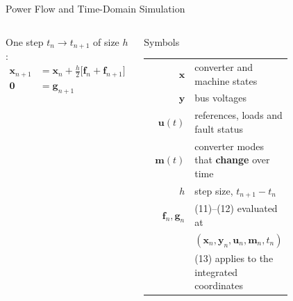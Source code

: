 \documentclass{beamer}
\begin{document}
\begin{frame}{Power Flow and Time-Domain Simulation}
\begin{columns}[t,onlytextwidth]
\begin{minipage}[t][3.65cm][t]{\linewidth}
One step $t_n\!\to\!t_{n+1}$ of size $h$:
\vspace{-0.10cm}
\begin{align}
\bm x_{n+1}&=\bm x_n+\tfrac{h}{2}\bigl[\bm f_n+\bm f_{n+1}\bigr]\\
\bm 0&=\bm g_{n+1}
\end{align}
\end{minipage}
\begin{block}{Symbols}
\begin{minipage}[t][2.30cm][t]{\linewidth}
\raggedright
{\tiny
\begin{tabular}{@{}r@{\;\;}p{0.68\linewidth}@{}}
$\bm x$ & converter and machine states\\
$\bm y$ & bus voltages\\
$\bm u(t)$ & references, loads and fault status\\
$\bm m(t)$ & converter modes that \textbf{change} over time\\
$h$ & step size, $t_{n+1}-t_n$\\
$\bm f_n,\bm g_n$ & (11)--(12) evaluated at\\
 & $(\bm x_n,\bm y_n,\bm u_n,\bm m_n,t_n)$\\
 & (13) applies to the integrated coordinates
\end{tabular}}
\end{minipage}
\end{block}
\end{columns}
\end{frame}
\end{document}
